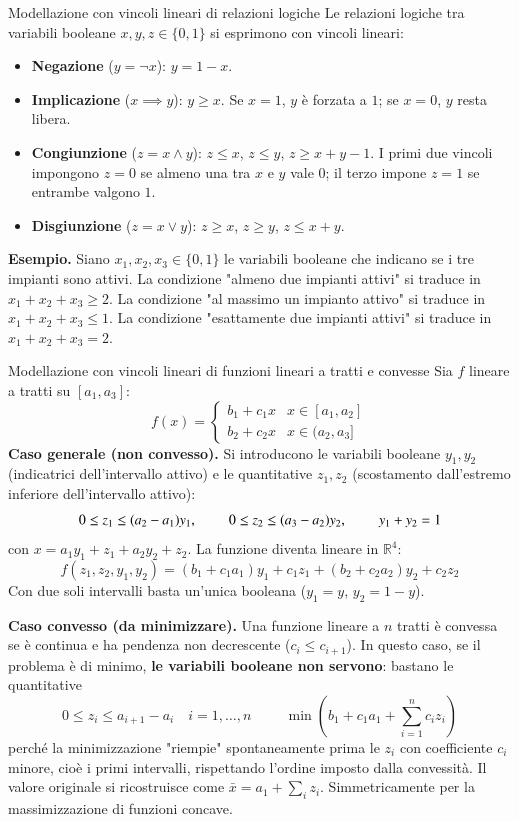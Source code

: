 \documentclass[12pt]{extarticle} %
\begin{document}
\begin{teoriabox}{Modellazione con vincoli lineari di relazioni logiche}
Le relazioni logiche tra variabili booleane $x,y,z \in \{0,1\}$ si esprimono con vincoli lineari:
\begin{itemize}
    \item \textbf{Negazione} ($y = \neg x$): $y = 1-x$.
    \item \textbf{Implicazione} ($x \implies y$): $y \ge x$. Se $x=1$, $y$ è forzata a $1$; se $x=0$, $y$ resta libera.
    \item \textbf{Congiunzione} ($z = x \wedge y$): $z \le x$, $z \le y$, $z \ge x+y-1$. I primi due vincoli impongono $z=0$ se almeno una tra $x$ e $y$ vale $0$; il terzo impone $z=1$ se entrambe valgono $1$.
    \item \textbf{Disgiunzione} ($z = x \vee y$): $z \ge x$, $z \ge y$, $z \le x+y$.
\end{itemize}

\noindent\textbf{Esempio.} Siano $x_1,x_2,x_3 \in \{0,1\}$ le variabili booleane che indicano se i tre impianti sono attivi. La condizione "almeno due impianti attivi" si traduce in $x_1+x_2+x_3 \ge 2$. La condizione "al massimo un impianto attivo" si traduce in $x_1+x_2+x_3 \le 1$. La condizione "esattamente due impianti attivi" si traduce in $x_1+x_2+x_3 = 2$.
\end{teoriabox}

\begin{teoriabox}{Modellazione con vincoli lineari di funzioni lineari a tratti e convesse}
Sia $f$ lineare a tratti su $[a_1,a_3]$:
\[
f(x) = \begin{cases} b_1 + c_1x & x \in [a_1,a_2]\\ b_2 + c_2x & x \in (a_2,a_3]\end{cases}
\]
\textbf{Caso generale (non convesso).} Si introducono le variabili booleane $y_1, y_2$ (indicatrici dell'intervallo attivo) e le quantitative $z_1, z_2$ (scostamento dall'estremo inferiore dell'intervallo attivo):
\[
0 \le z_1 \le (a_2-a_1)y_1, \hspace{0.8cm} 0 \le z_2 \le (a_3-a_2)y_2, \hspace{0.8cm} y_1+y_2 = 1
\]
con $x = a_1y_1 + z_1 + a_2y_2 + z_2$. La funzione diventa lineare in $\mathbb{R}^4$:
\[
f(z_1,z_2,y_1,y_2) = (b_1+c_1a_1)y_1 + c_1z_1 + (b_2+c_2a_2)y_2 + c_2z_2
\]
Con due soli intervalli basta un'unica booleana ($y_1 = y$, $y_2 = 1-y$).

\noindent\textbf{Caso convesso (da minimizzare).} Una funzione lineare a $n$ tratti è convessa se è continua e ha pendenza non decrescente ($c_i \le c_{i+1}$). In questo caso, se il problema è di minimo, \textbf{le variabili booleane non servono}: bastano le quantitative
\[
0 \le z_i \le a_{i+1}-a_i \quad i=1,\dots,n \hspace{1cm} \min \left(b_1 + c_1a_1 + \sum_{i=1}^n c_i z_i\right)
\]
perché la minimizzazione "riempie" spontaneamente prima le $z_i$ con coefficiente $c_i$ minore, cioè i primi intervalli, rispettando l'ordine imposto dalla convessità. Il valore originale si ricostruisce come $\bar{x} = a_1 + \sum_i z_i$. Simmetricamente per la massimizzazione di funzioni concave.
\end{teoriabox}
\end{document}
